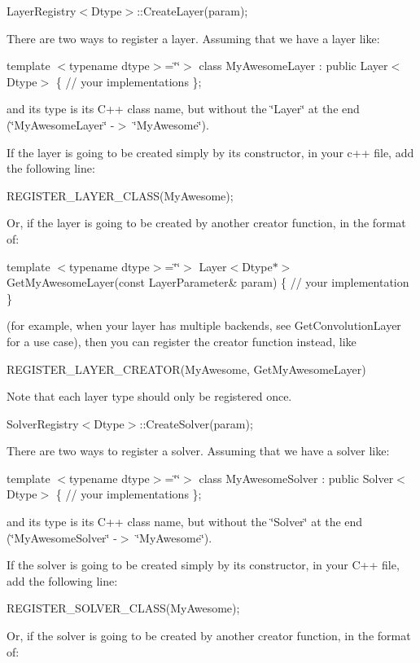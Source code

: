 Layer\+Registry$<$\+Dtype$>$\+::\+Create\+Layer(param);

There are two ways to register a layer. Assuming that we have a layer like\+:

template $<$typename dtype$>$=\char`\"{}\char`\"{}$>$ class My\+Awesome\+Layer \+: public Layer$<$\+Dtype$>$ \{ // your implementations \};

and its type is its C++ class name, but without the \char`\"{}\+Layer\char`\"{} at the end (\char`\"{}\+My\+Awesome\+Layer\char`\"{} -\/$>$ \char`\"{}\+My\+Awesome\char`\"{}).

If the layer is going to be created simply by its constructor, in your c++ file, add the following line\+:

R\+E\+G\+I\+S\+T\+E\+R\+\_\+\+L\+A\+Y\+E\+R\+\_\+\+C\+L\+A\+S\+S(\+My\+Awesome);

Or, if the layer is going to be created by another creator function, in the format of\+:

template $<$typename dtype$>$=\char`\"{}\char`\"{}$>$ Layer$<$\+Dtype$\ast$$>$ Get\+My\+Awesome\+Layer(const Layer\+Parameter\& param) \{ // your implementation \}

(for example, when your layer has multiple backends, see Get\+Convolution\+Layer for a use case), then you can register the creator function instead, like

R\+E\+G\+I\+S\+T\+E\+R\+\_\+\+L\+A\+Y\+E\+R\+\_\+\+C\+R\+E\+A\+T\+O\+R(\+My\+Awesome, Get\+My\+Awesome\+Layer)

Note that each layer type should only be registered once.

Solver\+Registry$<$\+Dtype$>$\+::\+Create\+Solver(param);

There are two ways to register a solver. Assuming that we have a solver like\+:

template $<$typename dtype$>$=\char`\"{}\char`\"{}$>$ class My\+Awesome\+Solver \+: public Solver$<$\+Dtype$>$ \{ // your implementations \};

and its type is its C++ class name, but without the \char`\"{}\+Solver\char`\"{} at the end (\char`\"{}\+My\+Awesome\+Solver\char`\"{} -\/$>$ \char`\"{}\+My\+Awesome\char`\"{}).

If the solver is going to be created simply by its constructor, in your C++ file, add the following line\+:

R\+E\+G\+I\+S\+T\+E\+R\+\_\+\+S\+O\+L\+V\+E\+R\+\_\+\+C\+L\+A\+S\+S(\+My\+Awesome);

Or, if the solver is going to be created by another creator function, in the format of\+:

